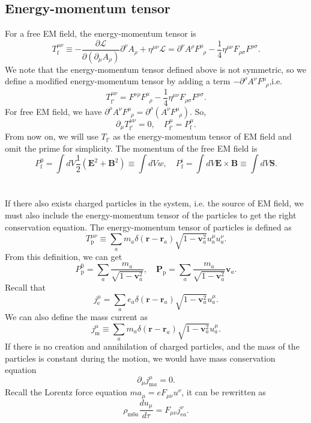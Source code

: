 \subsection{Energy-momentum tensor}
For a free EM field, the energy-momentum tensor is
\[T_{\mathrm{f}}^{\mu \nu} \equiv -\frac{\partial \mathcal{L}}{\partial(\partial_{\mu}A_{\rho})} \partial^{\nu} A_{\rho} + \eta^{\mu \nu} \mathcal{L} = \partial^{\nu}A^{\rho} F^{\mu}_{\phantom{\rho}\rho}-\frac{1}{4}\eta^{\mu\nu}F_{\rho\sigma}F^{\rho\sigma}.\]
We note that the energy-momentum tensor defined above is not symmetric, so we define a modified energy-momentum tensor by adding a term $-\partial^{\rho}A^{\nu}F^{\mu}_{\phantom{\rho}\rho}$,i.e.
\[T_{\mathrm{f}'}^{\mu\nu} = F^{\nu\rho}F^{\mu}_{\phantom{\rho}\rho}-\frac{1}{4}\eta^{\mu\nu}F_{\rho\sigma}F^{\rho\sigma}.\]
For free EM field, we have $\partial^{\rho}A^{\nu}F^{\mu}_{\phantom{\rho}\rho} = \partial^{\rho}\left(A^{\nu} F^{\mu}_{\phantom{\rho}\rho}\right)$.
So,
\[\partial_{\mu}T_{\mathrm{f}'}^{\mu\nu} = 0 , \quad P_{\mathrm{f}'}^{\mu} = P_{\mathrm{f}}^{\mu}.\]
From now on, we will use $T_{\mathrm{f}'}$ as the energy-momentum tensor of EM field and omit the prime for simplicity.
The momentum of the free EM field is
\[P_{\mathrm{f}}^{0} = \int dV \frac{1}{2}(\bm{E}^2+\bm{B}^2) \equiv \int dV w , \quad P_{\mathrm{f}}^{i} = \int dV \bm{E} \times \bm{B} \equiv \int dV \bm{S}.\]
\\ \\
If there also exists charged particles in the system, i.e. the source of EM field, we must also include the energy-momentum tensor of the particles to get the right conservation equation. The energy-momentum tensor of particles is defined as
\[T_{\mathrm{p}}^{\mu\nu} \equiv \sum_a m_a \delta(\bm{r}-\bm{r}_a) \sqrt{1-\bm{v}_a^2} u_a^\mu u_a^{\nu}.\]
From this definition, we can get
\[P_{\mathrm{p}}^0 = \sum_a \frac{m_a}{\sqrt{1-\bm{v}_a^2}} , \quad \bm{P}_{\mathrm{p}} =  \sum_a \frac{m_a}{\sqrt{1-\bm{v}_a^2}} \bm{v}_a.\]
Recall that
\[j^{\mu}_{\mathrm{e}} = \sum_a e_a \delta(\bm{r}-\bm{r}_a) \sqrt{1-\bm{v}_a^2} u_a^\mu .\]
We can also define the mass current as
\[j^{\mu}_{\mathrm{m}} \equiv \sum_a m_a \delta(\bm{r}-\bm{r}_a) \sqrt{1-\bm{v}_a^2} u_a^\mu .\]
If there is no creation and annihilation of charged particles, and the mass of the particles is constant during the motion, we would have mass conservation equation
\[\partial_{\mu} j^{\mu}_{\mathrm{m}a} = 0.\]
Recall the Lorentz force equation $m a_{\mu} = eF_{\mu\nu}u^{\nu}$, it can be rewritten as
\[\rho_{\mathrm{m}0a} \frac{du_{\mu}}{d\tau} = F_{\mu\nu}j_{\mathrm{e}a}^{\nu}.\]

